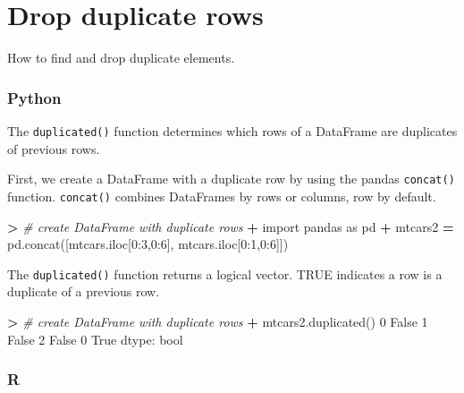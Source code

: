 \documentclass[
]{book}
\newenvironment{Shaded}{\begin{snugshade}}{\end{snugshade}}
\newcommand{\BuiltInTok}[1]{#1}
\newcommand{\CommentTok}[1]{\textcolor[rgb]{0.56,0.35,0.01}{\textit{#1}}}
\newcommand{\DecValTok}[1]{\textcolor[rgb]{0.00,0.00,0.81}{#1}}
\newcommand{\ImportTok}[1]{#1}
\newcommand{\NormalTok}[1]{#1}
\newcommand{\OperatorTok}[1]{\textcolor[rgb]{0.81,0.36,0.00}{\textbf{#1}}}
\newcommand{\VariableTok}[1]{\textcolor[rgb]{0.00,0.00,0.00}{#1}}
\begin{document}
\hypertarget{drop-duplicate-rows}{%
\section{Drop duplicate rows}\label{drop-duplicate-rows}}

How to find and drop duplicate elements.

\hypertarget{python-25}{%
\subsubsection*{Python}\label{python-25}}

The \texttt{duplicated()} function determines which rows of a DataFrame are duplicates of previous rows.

First, we create a DataFrame with a duplicate row by using the pandas \texttt{concat()} function. \texttt{concat()} combines DataFrames by rows or columns, row by default.

\begin{Shaded}
\begin{Highlighting}[]
\OperatorTok{\textgreater{}} \CommentTok{\# create DataFrame with duplicate rows}
\OperatorTok{+} \ImportTok{import}\NormalTok{ pandas }\ImportTok{as}\NormalTok{ pd}
\OperatorTok{+}\NormalTok{ mtcars2 }\OperatorTok{=}\NormalTok{ pd.concat([mtcars.iloc[}\DecValTok{0}\NormalTok{:}\DecValTok{3}\NormalTok{,}\DecValTok{0}\NormalTok{:}\DecValTok{6}\NormalTok{], mtcars.iloc[}\DecValTok{0}\NormalTok{:}\DecValTok{1}\NormalTok{,}\DecValTok{0}\NormalTok{:}\DecValTok{6}\NormalTok{]])}
\end{Highlighting}
\end{Shaded}

The \texttt{duplicated()} function returns a logical vector. TRUE indicates a row is a duplicate of a previous row.

\begin{Shaded}
\begin{Highlighting}[]
\OperatorTok{\textgreater{}} \CommentTok{\# create DataFrame with duplicate rows}
\OperatorTok{+}\NormalTok{ mtcars2.duplicated()}
\DecValTok{0}    \VariableTok{False}
\DecValTok{1}    \VariableTok{False}
\DecValTok{2}    \VariableTok{False}
\DecValTok{0}     \VariableTok{True}
\NormalTok{dtype: }\BuiltInTok{bool}
\end{Highlighting}
\end{Shaded}

\hypertarget{r-25}{%
\subsubsection*{R}\label{r-25}}
\end{document}
